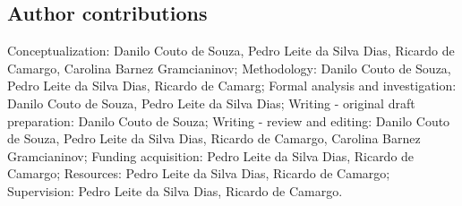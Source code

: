 \documentclass[pdflatex,sn-chicago]{sn-jnl}%
\theoremstyle{plain}
\theoremstyle{definition}
\theoremstyle{remark}
\theoremstyle{definition}
\begin{document}
\subsection*{Author contributions}

Conceptualization: Danilo Couto de Souza, Pedro Leite da Silva Dias, Ricardo de Camargo, Carolina Barnez Gramcianinov; Methodology: Danilo Couto de Souza, Pedro Leite da Silva Dias, Ricardo de Camarg; Formal analysis and investigation: Danilo Couto de Souza, Pedro Leite da Silva Dias; Writing - original draft preparation: Danilo Couto de Souza; Writing - review and editing: Danilo Couto de Souza, Pedro Leite da Silva Dias, Ricardo de Camargo, Carolina Barnez Gramcianinov; Funding acquisition: Pedro Leite da Silva Dias, Ricardo de Camargo; Resources: Pedro Leite da Silva Dias, Ricardo de Camargo; Supervision: Pedro Leite da Silva Dias, Ricardo de Camargo.

\end{document}
